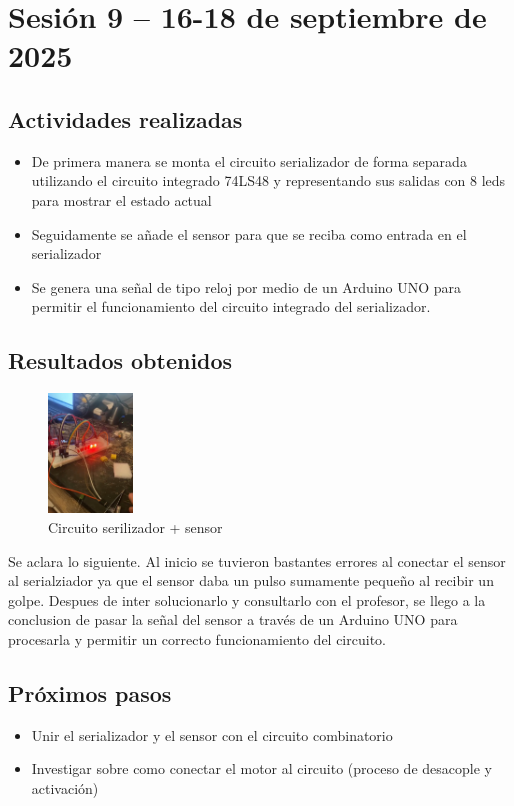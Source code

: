 \documentclass[12pt,letterpaper]{article}
\begin{document}
\section{Sesión 9 -- 16-18 de septiembre de 2025}
\subsection*{Actividades realizadas}
\begin{itemize}
    \item De primera manera se monta el circuito serializador de forma separada utilizando el circuito integrado 74LS48 y representando sus salidas con 8 leds para mostrar el estado actual
    \item Seguidamente se añade el sensor para que se reciba como entrada en el serializador
    \item Se genera una señal de tipo reloj por medio de un Arduino UNO para permitir el funcionamiento del circuito integrado del serializador.
\end{itemize}

\subsection*{Resultados obtenidos}
\begin{figure}[H]
    \centering
    \includegraphics[width=0.2\textwidth]{images/seri_real.png} %
    \caption{Circuito serilizador + sensor}
    \label{fig:todo_taller}
\end{figure}
Se aclara lo siguiente. Al inicio se tuvieron bastantes errores al conectar el sensor al serialziador ya que el sensor daba un pulso sumamente pequeño al recibir un golpe. Despues de inter solucionarlo y consultarlo con el profesor, se llego a la conclusion de pasar la señal del sensor a través de un Arduino UNO para procesarla y permitir un correcto funcionamiento del circuito.

\subsection*{Próximos pasos}
\begin{itemize}
    \item Unir el serializador y el sensor con el circuito combinatorio 
    \item Investigar sobre como conectar el motor al circuito (proceso de desacople y activación)
\end{itemize}
\end{document}
